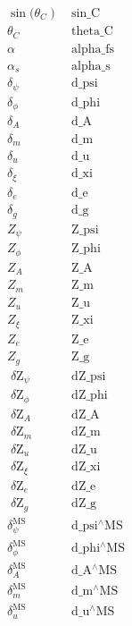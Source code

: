 \documentclass[../FeynCalcManual.tex]{subfiles}
\begin{document}
\begin{dmath*}
\begin{array}{cc}
 \left.\sin (\theta _C\right) & \;\text{sin$\_$C} \\
 \theta _C & \;\text{theta$\_$C} \\
 \alpha  & \;\text{alpha$\_$fs} \\
 \alpha _s & \;\text{alpha$\_$s} \\
 \delta _{\psi } & \;\text{d$\_$psi} \\
 \delta _{\phi } & \;\text{d$\_$phi} \\
 \delta _A & \;\text{d$\_$A} \\
 \delta _m & \;\text{d$\_$m} \\
 \delta _u & \;\text{d$\_$u} \\
 \delta _{\xi } & \;\text{d$\_$xi} \\
 \delta _e & \;\text{d$\_$e} \\
 \delta _g & \;\text{d$\_$g} \\
 Z_{\psi } & \;\text{Z$\_$psi} \\
 Z_{\phi } & \;\text{Z$\_$phi} \\
 Z_A & \;\text{Z$\_$A} \\
 Z_m & \;\text{Z$\_$m} \\
 Z_u & \;\text{Z$\_$u} \\
 Z_{\xi } & \;\text{Z$\_$xi} \\
 Z_e & \;\text{Z$\_$e} \\
 Z_g & \;\text{Z$\_$g} \\
 \;\text{$\delta $Z}_{\psi } & \;\text{dZ$\_$psi} \\
 \;\text{$\delta $Z}_{\phi } & \;\text{dZ$\_$phi} \\
 \;\text{$\delta $Z}_A & \;\text{dZ$\_$A} \\
 \;\text{$\delta $Z}_m & \;\text{dZ$\_$m} \\
 \;\text{$\delta $Z}_u & \;\text{dZ$\_$u} \\
 \;\text{$\delta $Z}_{\xi } & \;\text{dZ$\_$xi} \\
 \;\text{$\delta $Z}_e & \;\text{dZ$\_$e} \\
 \;\text{$\delta $Z}_g & \;\text{dZ$\_$g} \\
 \delta _{\psi }^{\text{MS}} & \;\text{d$\_$psi${}^{\wedge}$MS} \\
 \delta _{\phi }^{\text{MS}} & \;\text{d$\_$phi${}^{\wedge}$MS} \\
 \delta _A^{\text{MS}} & \;\text{d$\_$A${}^{\wedge}$MS} \\
 \delta _m^{\text{MS}} & \;\text{d$\_$m${}^{\wedge}$MS} \\
 \delta _u^{\text{MS}} & \;\text{d$\_$u${}^{\wedge}$MS} \\

\end{array}
\end{dmath*}
\end{document}
